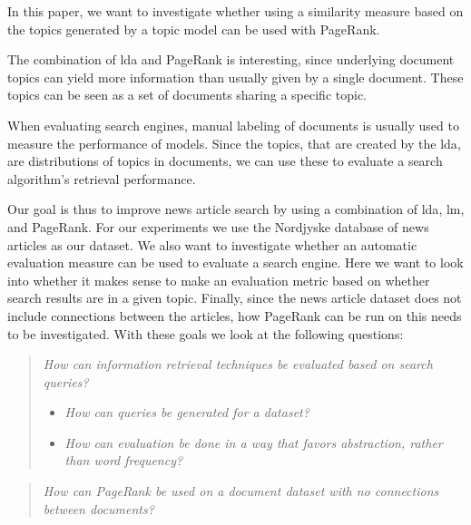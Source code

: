 	In this paper, we want to investigate whether using a similarity measure based on the topics generated by a topic model can be used with PageRank.
	
	The combination of \gls{lda} and PageRank is interesting, since underlying document topics can yield more information than usually given by a single document.
	These topics can be seen as a set of documents sharing a specific topic. 
	
	When evaluating search engines, manual labeling of documents is usually used to measure the performance of models\cite{yang2009topic}\cite{Tang2008}.
	Since the topics, that are created by the \gls{lda}, are distributions of topics in documents, we can use these to evaluate a search algorithm's retrieval performance. 
	
	Our goal is thus to improve news article search by using a combination of \gls{lda}, \gls{lm}, and PageRank.
	For our experiments we use the Nordjyske database of news articles as our dataset.
	We also want to investigate whether an automatic evaluation measure can be used to evaluate a search engine.
	Here we want to look into whether it makes sense to make an evaluation metric based on whether search results are in a given topic.
	Finally, since the news article dataset does not include connections between the articles, how PageRank can be run on this needs to be investigated.
	With these goals we look at the following questions:
	
	\begin{quote}
		\emph{How can information retrieval techniques be evaluated based on search queries?}
		\begin{itemize}
			\item \emph{How can queries be generated for a dataset?}
			\item \emph{How can evaluation be done in a way that favors abstraction, rather than word frequency?}
		\end{itemize}
	\end{quote}
	\vspace{0.1 cm}
	
	\begin{quote}
		\emph{How can PageRank be used on a document dataset with no connections between documents?}
	\end{quote}
	
	
	
	
